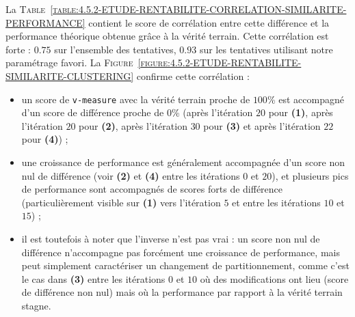 			La \textsc{Table~\ref{table:4.5.2-ETUDE-RENTABILITE-CORRELATION-SIMILARITE-PERFORMANCE}} contient le score de corrélation entre cette différence et la performance théorique obtenue grâce à la vérité terrain.
			Cette corrélation est forte : $0.75$ sur l'ensemble des tentatives, $0.93$ sur les tentatives utilisant notre paramétrage favori.
			La \textsc{Figure~\ref{figure:4.5.2-ETUDE-RENTABILITE-SIMILARITE-CLUSTERING}} confirme cette corrélation :
			\begin{itemize}
				\item un score de \texttt{v-measure} avec la vérité terrain proche de $100$\% est accompagné d'un score de différence proche de $0$\% (après l'itération $20$ pour \textbf{(1)}, après l'itération $20$ pour \textbf{(2)}, après l'itération $30$ pour \textbf{(3)} et après l'itération $22$ pour \textbf{(4)}) ;
				\item une croissance de performance est généralement accompagnée d'un score non nul de différence (voir \textbf{(2)} et \textbf{(4)} entre les itérations $0$ et $20$), et plusieurs pics de performance sont accompagnés de scores forts de différence (particulièrement visible sur \textbf{(1)} vers l'itération $5$ et entre les itérations $10$ et $15$) ;
				\item il est toutefois à noter que l'inverse n'est pas vrai : un score non nul de différence n'accompagne pas forcément une croissance de performance, mais peut simplement caractériser un changement de partitionnement, comme c'est le cas dans \textbf{(3)} entre les itérations $0$ et $10$ où des modifications ont lieu (score de différence non nul) mais où la performance par rapport à la vérité terrain stagne.
			\end{itemize}
